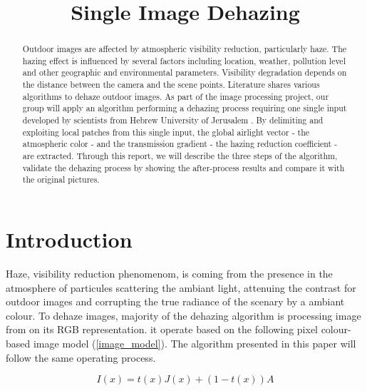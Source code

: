 \documentclass[conference]{IEEEtran}
\begin{document}
\title{Single Image Dehazing}

\author{
\and
{}
\and
{}
}

\maketitle

\begin{abstract}
Outdoor images are affected by atmospheric visibility reduction, particularly haze. The hazing effect is influenced by several 
factors including location, weather, pollution level and other geographic and environmental parameters. Visibility degradation depends on the distance between the camera and the scene points. Literature shares various algorithms to dehaze outdoor 
images.  As part of the image processing project, our group will apply an algorithm performing a dehazing process requiring
one single input developed by scientists from Hebrew University of Jerusalem \cite{b1} \cite{b2}. By delimiting and exploiting local patches from this single input, the global airlight vector - the atmospheric
 color - and the transmission gradient - the hazing reduction coefficient - are extracted.  Through this report, we will describe 
 the three steps of the algorithm, validate the dehazing process by showing the after-process results and compare it with the 
 original pictures.  
\end{abstract}

\section{Introduction}

Haze, visibility reduction phenomenom, is coming from the presence in the atmosphere of particules scattering the ambiant 
light, attenuing the contrast for outdoor images and corrupting the true radiance of the scenary by a ambiant colour.
To dehaze images, majority of the dehazing algorithm is processing image from on its RGB representation.
 it operate based on the following pixel colour-based image model (\ref{image_model}).  The algorithm presented in this paper will follow the same 
operating process.

\begin{equation}
\label{image_model}
I(x) = t(x) J(x) + (1-t(x)) A
\end{equation}
\end{document}
